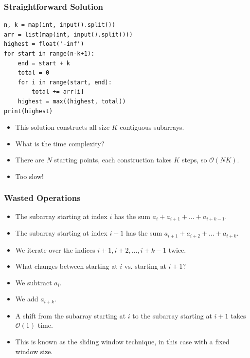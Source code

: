 \documentclass[10pt]{beamer}
\begin{document}
\begin{frame}
    \frametitle{Straightforward Solution}
	\begin{scriptsize}
        \begin{verbatim}
n, k = map(int, input().split())
arr = list(map(int, input().split()))
highest = float('-inf')
for start in range(n-k+1):
    end = start + k
    total = 0
    for i in range(start, end):
        total += arr[i]
    highest = max((highest, total))
print(highest)
        \end{verbatim}
    \end{scriptsize}
    \begin{itemize}
        \item<2-> This solution constructs all size $K$ contiguous subarrays.
        \item<3-> What is the time complexity?
        \item<4-> There are $N$ starting points, each construction takes $K$ steps, so $\mathcal{O}(NK)$.
        \item<5-> Too slow!
    \end{itemize}
\end{frame}

\begin{frame}
    \frametitle{Wasted Operations}
    \begin{itemize}
        \item<1-> The subarray starting at index $i$ has the sum $a_i + a_{i+1} + \dots + a_{i+k-1}$.
        \item<2-> The subarray starting at index $i+1$ has the sum $a_{i+1} + a_{i+2} + \dots + a_{i+k}$.
        \item<3-> We iterate over the indices $i+1, i+2, \dotsc, i+k-1$ twice.
        \item<4-> What changes between starting at $i$ vs. starting at $i+1$?
        \item<5-> We subtract $a_i$.
        \item<6-> We add $a_{i+k}$.
        \item<7-> A shift from the subarray starting at $i$ to the subarray starting at $i+1$ takes $\mathcal{O}(1)$ time.
        \item<8-> This is known as the sliding window technique, in this case with a fixed window size.
    \end{itemize}
\end{frame}
\end{document}
